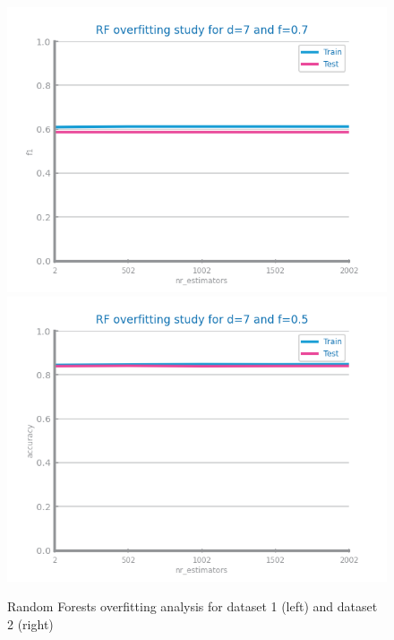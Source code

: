 \documentclass[10pt]{extarticle}
\begin{document}
\begin{figure}[H]
\centering\includegraphics[scale=0.7]{images/dataset1/models_evaluation/CovidPos_rf_f1_overfitting.png}
\includegraphics[scale=0.7]{images/dataset2/models_evaluation/Credit_Score_rf_accuracy_overfitting.png}
\caption{Random Forests overfitting analysis for dataset 1 (left) and dataset 2 (right)}
\end{figure}
\end{document}
